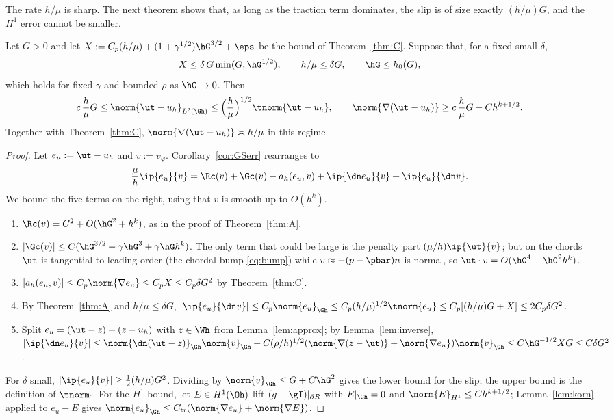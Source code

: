 The rate $h/\mu$ is sharp. The next theorem shows that, as long as the traction term dominates, the slip is of size exactly $(h/\mu)G$, and the $H^1$ error cannot be smaller.

\begin{theorem}\label{thm:B}
Let $G>0$ and let $X:=C_p(h/\mu)+(1+\gamma^{1/2})\hG^{3/2}+\eps$ be the bound of Theorem~\ref{thm:C}. Suppose that, for a fixed small $\delta$,
\[
X\le\delta\,G\min(G,\hG^{1/2}),\qquad h/\mu\le\delta G,\qquad \hG\le h_0(G),
\]
which holds for fixed $\gamma$ and bounded $\rho$ as $\hG\to0$. Then
\[
c\,\frac h\mu G\le\norm{\ut-u_h}_{L^2(\Gh)}\le\Bigl(\frac h\mu\Bigr)^{1/2}\tnorm{\ut-u_h},\qquad
\norm{\nabla(\ut-u_h)}\ge c\,\frac h\mu G-Ch^{k+1/2}.
\]
Together with Theorem~\ref{thm:C}, $\norm{\nabla(\ut-u_h)}\asymp h/\mu$ in this regime.
\end{theorem}

\begin{proof}
Let $e_u:=\ut-u_h$ and $v:=v_\varphi$. Corollary~\ref{cor:GSerr} rearranges to
\[
\frac\mu h\ip{e_u}{v}=\Rc(v)+\Gc(v)-a_h(e_u,v)+\ip{\dn e_u}{v}+\ip{e_u}{\dn v}.
\]
We bound the five terms on the right, using that $v$ is smooth up to $O(h^k)$.
\begin{enumerate}
\item $\Rc(v)=G^2+O(\hG^2+h^k)$, as in the proof of Theorem~\ref{thm:A}.
\item $|\Gc(v)|\le C(\hG^{3/2}+\gamma\hG^3+\gamma\hG h^k)$. The only term that could be large is the penalty part $(\mu/h)\ip{\ut}{v}$; but on the chords $\ut$ is tangential to leading order (the chordal bump \eqref{eq:bump}) while $v\approx-(p-\pbar)n$ is normal, so $\ut\cdot v=O(\hG^4+\hG^2h^k)$.
\item $|a_h(e_u,v)|\le C_p\norm{\nabla e_u}\le C_pX\le C_p\delta G^2$ by Theorem~\ref{thm:C}.
\item By Theorem~\ref{thm:A} and $h/\mu\le\delta G$, $|\ip{e_u}{\dn v}|\le C_p\norm{e_u}_{\Gh}\le C_p(h/\mu)^{1/2}\tnorm{e_u}\le C_p[(h/\mu)G+X]\le2C_p\delta G^2$.
\item Split $e_u=(\ut-z)+(z-u_h)$ with $z\in\Wh$ from Lemma~\ref{lem:approx}; by Lemma~\ref{lem:inverse}, $|\ip{\dn e_u}{v}|\le\norm{\dn(\ut-z)}_{\Gh}\norm{v}_{\Gh}+C(\rho/h)^{1/2}(\norm{\nabla(z-\ut)}+\norm{\nabla e_u})\norm{v}_{\Gh}\le C\hG^{-1/2}XG\le C\delta G^2$.
\end{enumerate}
For $\delta$ small, $|\ip{e_u}{v}|\ge\frac12(h/\mu)G^2$. Dividing by $\norm{v}_{\Gh}\le G+C\hG^2$ gives the lower bound for the slip; the upper bound is the definition of $\tnorm\cdot$. For the $H^1$ bound, let $E\in H^1(\Oh)$ lift $(g-\gI)|_{\partial R}$ with $E|_{\Gh}=0$ and $\norm{E}_{H^1}\le Ch^{k+1/2}$; Lemma~\ref{lem:korn} applied to $e_u-E$ gives $\norm{e_u}_{\Gh}\le C_{\mathrm{tr}}(\norm{\nabla e_u}+\norm{\nabla E})$.
\end{proof}

